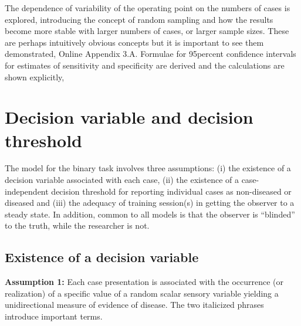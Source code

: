 \documentclass[
]{book}
\begin{document}
The dependence of variability of the operating point on the numbers of cases is explored, introducing the concept of random sampling and how the results become more stable with larger numbers of cases, or larger sample sizes. These are perhaps intuitively obvious concepts but it is important to see them demonstrated, Online Appendix 3.A. Formulae for 95percent confidence intervals for estimates of sensitivity and specificity are derived and the calculations are shown explicitly,

\hypertarget{binary-task-model-z-sample-model}{%
\section{Decision variable and decision threshold}\label{binary-task-model-z-sample-model}}

The model for the binary task involves three assumptions: (i) the existence of a decision variable associated with each case, (ii) the existence of a case-independent decision threshold for reporting individual cases as non-diseased or diseased and (iii) the adequacy of training session(s) in getting the observer to a steady state. In addition, common to all models is that the observer is ``blinded'' to the truth, while the researcher is not.

\hypertarget{existence-of-a-decision-variable}{%
\subsection{Existence of a decision variable}\label{existence-of-a-decision-variable}}

\textbf{Assumption 1:} Each case presentation is associated with the occurrence (or realization) of a specific value of a random scalar sensory variable yielding a unidirectional measure of evidence of disease. The two italicized phrases introduce important terms.
\end{document}

